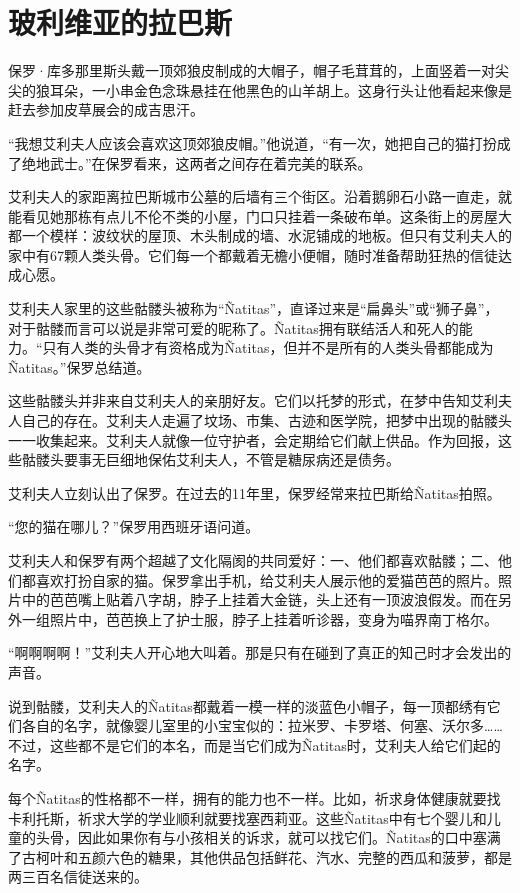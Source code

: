 \documentclass[12pt,oneside]{book}
\begin{document}
\section{玻利维亚的拉巴斯}
\begin{bookref}[frametitle={\cite{好好告别：世界葬礼观察手记}}]
保罗·库多那里斯头戴一顶郊狼皮制成的大帽子，帽子毛茸茸的，上面竖着一对尖尖的狼耳朵，一小串金色念珠悬挂在他黑色的山羊胡上。这身行头让他看起来像是赶去参加皮草展会的成吉思汗。

“我想艾利夫人应该会喜欢这顶郊狼皮帽。”他说道，“有一次，她把自己的猫打扮成了绝地武士。”在保罗看来，这两者之间存在着完美的联系。

艾利夫人的家距离拉巴斯城市公墓的后墙有三个街区。沿着鹅卵石小路一直走，就能看见她那栋有点儿不伦不类的小屋，门口只挂着一条破布单。这条街上的房屋大都一个模样：波纹状的屋顶、木头制成的墙、水泥铺成的地板。但只有艾利夫人的家中有67颗人类头骨。它们每一个都戴着无檐小便帽，随时准备帮助狂热的信徒达成心愿。

艾利夫人家里的这些骷髅头被称为“Ñatitas”，直译过来是“扁鼻头”或“狮子鼻”，对于骷髅而言可以说是非常可爱的昵称了。Ñatitas拥有联结活人和死人的能力。“只有人类的头骨才有资格成为Ñatitas，但并不是所有的人类头骨都能成为Ñatitas。”保罗总结道。

这些骷髅头并非来自艾利夫人的亲朋好友。它们以托梦的形式，在梦中告知艾利夫人自己的存在。艾利夫人走遍了坟场、市集、古迹和医学院，把梦中出现的骷髅头一一收集起来。艾利夫人就像一位守护者，会定期给它们献上供品。作为回报，这些骷髅头要事无巨细地保佑艾利夫人，不管是糖尿病还是债务。

艾利夫人立刻认出了保罗。在过去的11年里，保罗经常来拉巴斯给Ñatitas拍照。

“您的猫在哪儿？”保罗用西班牙语问道。

艾利夫人和保罗有两个超越了文化隔阂的共同爱好：一、他们都喜欢骷髅；二、他们都喜欢打扮自家的猫。保罗拿出手机，给艾利夫人展示他的爱猫芭芭的照片。照片中的芭芭嘴上贴着八字胡，脖子上挂着大金链，头上还有一顶波浪假发。而在另外一组照片中，芭芭换上了护士服，脖子上挂着听诊器，变身为喵界南丁格尔。

“啊啊啊啊！”艾利夫人开心地大叫着。那是只有在碰到了真正的知己时才会发出的声音。

说到骷髅，艾利夫人的Ñatitas都戴着一模一样的淡蓝色小帽子，每一顶都绣有它们各自的名字，就像婴儿室里的小宝宝似的：拉米罗、卡罗塔、何塞、沃尔多……不过，这些都不是它们的本名，而是当它们成为Ñatitas时，艾利夫人给它们起的名字。

每个Ñatitas的性格都不一样，拥有的能力也不一样。比如，祈求身体健康就要找卡利托斯，祈求大学的学业顺利就要找塞西莉亚。这些Ñatitas中有七个婴儿和儿童的头骨，因此如果你有与小孩相关的诉求，就可以找它们。Ñatitas的口中塞满了古柯叶和五颜六色的糖果，其他供品包括鲜花、汽水、完整的西瓜和菠萝，都是两三百名信徒送来的。


\end{bookref}
\end{document}
